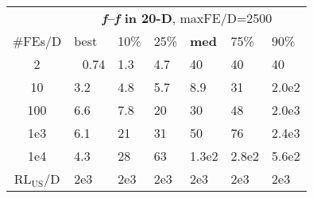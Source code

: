 \begin{tabular}{c|llllll}
 & \multicolumn{6}{|c}{\textbf{\textit{f}\raisebox{-0.35ex}{1}--\textit{f}\raisebox{-0.35ex}{24} in 20-D}, maxFE/D=2500}\\
\#FEs/D & best & 10\% & 25\% & \textbf{med} & 75\% & 90\%\\
2 & ~\,0.74 & \hspace*{1ex}1.3 & \hspace*{1ex}4.7 & 40 & 40 & 40\\
10 & \hspace*{1ex}3.2 & \hspace*{1ex}4.8 & \hspace*{1ex}5.7 & \hspace*{1ex}8.9 & 31 & 2.0e2\\
100 & \hspace*{1ex}6.6 & \hspace*{1ex}7.8 & 20 & 30 & 48 & 2.0e3\\
1e3 & \hspace*{1ex}6.1 & 21 & 31 & 50 & 76 & 2.4e3\\
1e4 & \hspace*{1ex}4.3 & 28 & 63 & 1.3e2 & 2.8e2 & 5.6e2\\
$\text{RL}_{\text{US}}$/D & 2e3 & 2e3 & 2e3 & 2e3 & 2e3 & 2e3
\end{tabular}
